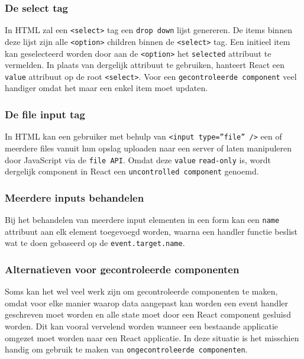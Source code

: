 \subsubsection{De select tag}

In HTML zal een \texttt{<select>} tag een \texttt{drop down} lijst genereren. De items binnen deze lijst zijn alle \texttt{<option>} children binnen de \texttt{<select>} tag. Een initieel item kan geselecteerd worden door aan de \texttt{<option>} het \texttt{selected} attribuut te vermelden. In plaats van dergelijk attribuut te gebruiken, hanteert React een \texttt{value} attribuut op de root \texttt{<select>}. Voor een \texttt{gecontroleerde component} veel handiger omdat het maar een enkel item moet updaten. \autocite{React2019i}

\subsubsection{De file input tag}

In HTML kan een gebruiker met behulp van \texttt{<input type=''file'' />} een of meerdere files vanuit hun opslag uploaden naar een server of laten manipuleren door JavaScript via de \texttt{file API}. Omdat deze \texttt{value} \texttt{read-only} is, wordt dergelijk component in React een \texttt{uncontrolled component} genoemd. \autocite{React2019i}

\subsubsection{Meerdere inputs behandelen}

Bij het behandelen van meerdere input elementen in een form kan een \texttt{name} attribuut aan elk element toegevoegd worden, waarna een handler functie beslist wat te doen gebaseerd op de \texttt{event.target.name}. \autocite{React2019i}

\subsubsection{Alternatieven voor gecontroleerde componenten}

Soms kan het wel veel werk zijn om gecontroleerde componenten te maken, omdat voor elke manier waarop data aangepast kan worden een event handler geschreven moet worden en alle state moet door een React component gesluisd worden. Dit kan vooral vervelend worden wanneer een bestaande applicatie omgezet moet worden naar een React applicatie. In deze situatie is het misschien handig om gebruik te maken van \texttt{ongecontroleerde componenten}.  \autocite{React2019i}

